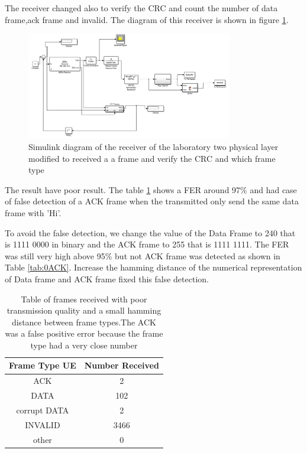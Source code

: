 The receiver changed also to verify the CRC and count the number of data frame,ack frame and invalid. The diagram of this receiver is
shown in figure \ref{fig:receiver_lab02}.

\begin{figure}[ht]
    \centering
    \includegraphics[width=0.8\textwidth]{receiver_lab02.PNG}
    \caption{Simulink diagram of the receiver of the laboratory two physical layer modified to received a a frame and verify the CRC and which frame type }
    \label{fig:receiver_lab02}
\end{figure}


The result have poor result. The table \ref{tab:2ACK} shows a FER around 97\% and had case of false detection of a ACK frame when the transmitted only send
the same data frame with 'Hi'.  


To avoid the false detection, we change the value of the Data Frame to 240 that is 1111 0000 in binary and the ACK frame to 255 that is 1111 1111.
The FER was still very high above 95\% but not ACK frame was detected as shown in Table \ref{tab:0ACK}. Increase the hamming distance of the numerical representation of Data frame and ACK frame 
fixed this false detection.
 




\begin{table}[ht]
	\centering
		\begin{tabular}{| c | c | }
		\hline                       
		Frame Type UE & Number Received\\
		\hline
			ACK & 2\\
			DATA & 102\\
			corrupt DATA & 2\\
			INVALID & 3466\\
			other & 0\\
		\hline
		\end{tabular}
	\caption{Table of frames received with poor transmission quality and a small hamming distance between frame types.The ACK was a false positive error because the frame type had a very close number}
	\label{tab:2ACK}
\end{table}

